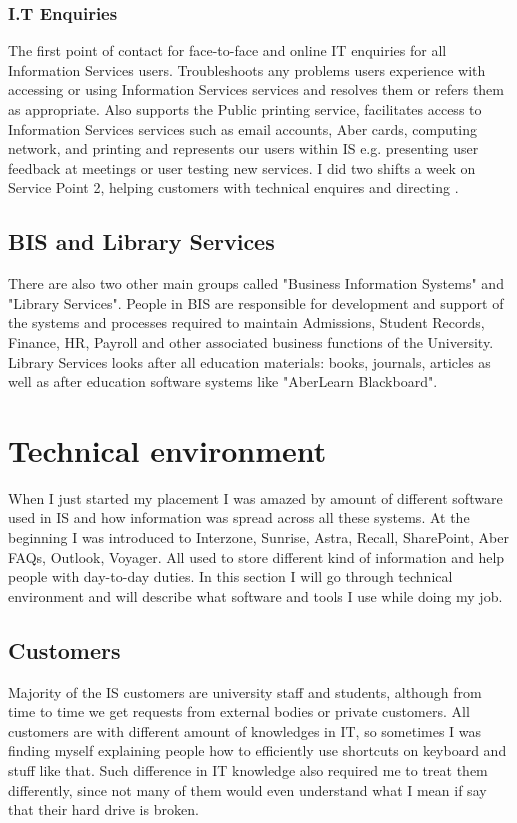\documentclass[10pt,a4paper,headinclude=true]{report}
\begin{document}
\subsection{I.T Enquiries}
The first point of contact for face-to-face and online IT enquiries for all Information Services users. Troubleshoots any problems users experience with accessing or using Information Services services and resolves them or refers them as appropriate. Also supports the Public printing service, facilitates access to Information Services services such as email accounts, Aber cards, computing network, and printing and represents our users within IS e.g. presenting user feedback at meetings or user testing new services. I did two shifts a week on Service Point 2, helping customers with technical enquires and directing .

\section{BIS and Library Services}
There are also two other main groups called "Business Information Systems" and "Library Services". People in BIS are  responsible for development and support of the systems and processes required to maintain Admissions, Student Records, Finance, HR, Payroll and other associated business functions of the University. Library Services looks after all education materials: books, journals, articles as well as after education software systems like "AberLearn Blackboard".

\chapter{Technical environment}
When I just started my placement I was amazed by amount of different software used in IS and how information was spread across all these systems. At the beginning I was introduced to Interzone, Sunrise, Astra, Recall, SharePoint, Aber FAQs, Outlook, Voyager. All used to store different kind of information and help people with day-to-day duties. In this section I will go through technical environment and will describe what software and tools I use while doing my job.
\section{Customers}
Majority of the IS customers are university staff and students, although from time to time we get requests from external bodies or private customers. All customers are with different amount of knowledges in IT, so sometimes I was finding myself explaining people how to efficiently use shortcuts on keyboard and stuff like that. Such difference in IT knowledge also required me to treat them differently, since not many of them would even understand what I mean if say that their hard drive is broken.
\end{document}
